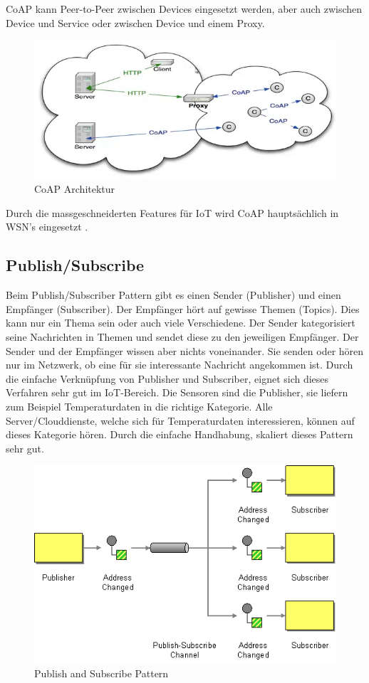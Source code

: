 CoAP kann Peer-to-Peer zwischen Devices eingesetzt werden, aber auch zwischen Device und Service oder zwischen Device und einem Proxy.
\begin{figure}[H]
\centering
\includegraphics[scale=0.8]{images/coap_architecture.png}
\caption{CoAP Architektur \cite{Shelby14}}
\end{figure}
  
Durch die massgeschneiderten Features für IoT wird CoAP hauptsächlich in WSN's eingesetzt \cite{Obermaier15}. 

\subsection{Publish/Subscribe}
Beim Publish/Subscriber Pattern gibt es einen Sender (Publisher) und einen Empfänger (Subscriber). Der Empfänger hört auf gewisse Themen (Topics). Dies kann nur ein Thema sein oder auch viele Verschiedene. Der Sender kategorisiert seine Nachrichten in Themen und sendet diese zu den jeweiligen Empfänger. Der Sender und der Empfänger wissen aber nichts voneinander. Sie senden oder hören nur im Netzwerk, ob eine für sie interessante Nachricht angekommen ist. Durch die einfache Verknüpfung von Publisher und Subscriber, eignet sich dieses Verfahren sehr gut im IoT-Bereich. Die Sensoren sind die Publisher, sie liefern zum Beispiel Temperaturdaten in die richtige Kategorie. Alle Server/Clouddienste, welche sich für Temperaturdaten interessieren, können auf dieses Kategorie hören. Durch die einfache Handhabung, skaliert dieses Pattern sehr gut.
\begin{figure}[H]
\centering
\includegraphics[scale=0.65]{images/publishsubscribe.png}
\caption{Publish and Subscribe Pattern\cite{PublishSubscribePattern}}
\end{figure}
